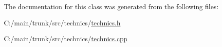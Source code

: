 The documentation for this class was generated from the following files:\begin{DoxyCompactItemize}
\item 
C:/main/trunk/src/technics/\hyperlink{technics_8h}{technics.h}\item 
C:/main/trunk/src/technics/\hyperlink{technics_8cpp}{technics.cpp}\end{DoxyCompactItemize}
